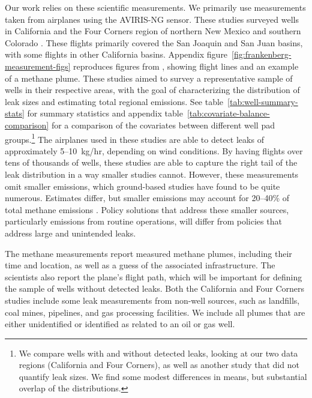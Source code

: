 \documentclass[12pt,oneside,letterpaper]{article}
\theoremstyle{definition}
\begin{document}
\begin{refsection}
Our work relies on these scientific measurements.
We primarily use measurements taken from airplanes using the \gls{AVIRIS-NG} sensor.
These studies surveyed wells in California and the Four Corners region of northern New Mexico and southern Colorado
\parencite{Duren/etal:2019, Frankenberg/etal:2016}.
These flights primarily covered the San Joaquin and San Juan basins, with some flights in other California basins.
Appendix figure~\ref{fig:frankenberg-measurement-figs} reproduces figures from \textcite{Frankenberg/etal:2016}, showing flight lines and an example of a methane plume.
These studies aimed to survey a representative sample of wells in their respective areas, with the goal of characterizing the distribution of leak sizes and estimating total regional emissions.
See table~\ref{tab:well-summary-stats} for summary statistics and
appendix table~\ref{tab:covariate-balance-comparison} for a comparison of the covariates between different well pad groups.\footnote{%
We compare wells with and without detected leaks, looking at our two data regions (California and Four Corners), as well as another study that did not quantify leak sizes.
We find some modest differences in means, but substantial overlap of the distributions.
}
The airplanes used in these studies are able to detect leaks of approximately 5--10~kg/hr, depending on wind conditions.
By having flights over tens of thousands of wells, these studies are able to capture the right tail of the leak distribution in a way smaller studies cannot.
However, these measurements omit smaller emissions, which ground-based studies have found to be quite numerous.
Estimates differ, but smaller emissions may account for 20--40\% of total methane emissions \parencite{ZavalaAraiza/etal:2015, Chen/Sherwin/Breman/Jones/Gordon/Wetherley/Kort/Brandt:2022}.
Policy solutions that address these smaller sources, particularly emissions from routine operations, will differ from policies that address large and unintended leaks.

The methane measurements report measured methane plumes, including their time and location, as well as a guess of the associated infrastructure.
The scientists also report the plane's flight path, which will be important for defining the sample of wells without detected leaks.
Both the California and Four Corners studies include some leak measurements from non-well sources, such as landfills, coal mines, pipelines, and gas processing facilities.
We include all plumes that are either unidentified or identified as related to an oil or gas well.




\end{refsection}
\end{document}
